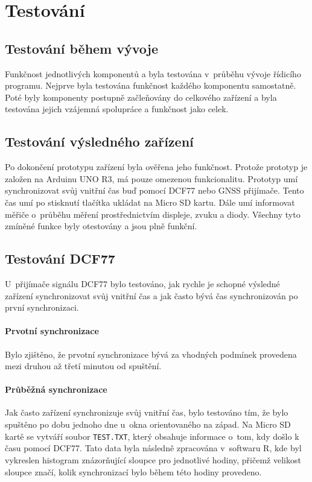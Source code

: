 \chapter{Testování}
\label{6-testovani}

\section{Testování během vývoje}
Funkčnost jednotlivých komponentů a byla testována v~průběhu vývoje řídicího programu. Nejprve byla testována funkčnost každého komponentu samostatně. Poté byly komponenty postupně začleňovány do celkového zařízení a byla testována jejich vzájemná spolupráce a funkčnost jako celek.

\section{Testování výsledného zařízení}
Po dokončení prototypu zařízení byla ověřena jeho funkčnost. Protože prototyp je založen na Arduinu UNO R3, má pouze omezenou funkcionalitu. Prototyp umí synchronizovat svůj vnitřní čas buď pomocí DCF77 nebo GNSS přijímače. Tento čas umí po stisknutí tlačítka ukládat na Micro SD kartu. Dále umí informovat měřiče o~průběhu měření prostřednictvím displeje, zvuku a diody. Všechny tyto zmíněné funkce byly otestovány a jsou plně funkční.

\section{Testování DCF77}
U~přijímače signálu DCF77 bylo testováno, jak rychle je schopné výsledné zařízení synchronizovat svůj vnitřní čas a jak často bývá čas synchronizován po první synchronizaci.

\subsubsection{Prvotní synchronizace}
Bylo zjištěno, že prvotní synchronizace bývá za vhodných podmínek provedena mezi druhou až třetí minutou od spuštění. 

\subsubsection{Průběžná synchronizace}
Jak často zařízení synchronizuje svůj vnitřní čas, bylo testováno tím, že bylo  spuštěno po dobu jednoho dne u~okna orientovaného na západ. Na Micro SD kartě se vytváří soubor \texttt{TEST.TXT}, který obsahuje informace o~tom, kdy došlo k~ času pomocí DCF77. Tato data byla následně zpracována v~softwaru R, kde byl vykreslen histogram znázorňující sloupce pro jednotlivé hodiny, přičemž velikost sloupce značí, kolik synchronizací bylo během této hodiny provedeno.

